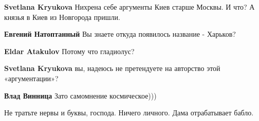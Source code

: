 \begin{itemize}
\begin{itemize}
 
\textbf{Svetlana Kryukova} Нихрена себе аргументы Киев старше Москвы. И что? А князья в Киев из Новгорода пришли.

 
\textbf{Евгений Натоптанный} Вы знаете откуда появилось название - Харьков?

 
\textbf{Eldar Atakulov} Потому что гладиолус?

 
\textbf{Svetlana Kryukova} вы, надеюсь не претендуете на авторство этой «аргументации»? \Smiley[1.0][yellow]

 
\textbf{Влад Винница} Зато самомнение космическое)))

 
Не тратьте нервы и буквы, господа. Ничего личного. Дама отрабатывает бабло.

 

\end{itemize}
\end{itemize}
